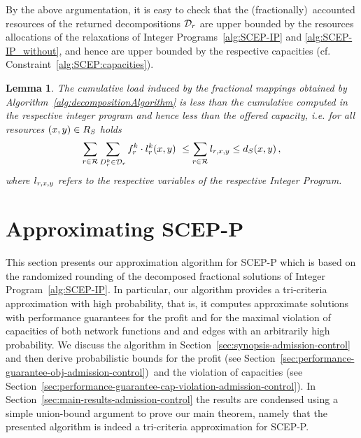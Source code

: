 \documentclass[10pt, conference, letterpaper]{IEEEtran}
\newtheorem{lemma}[theorem]{Lemma}
\begin{document}
By the above argumentation, it is easy to check that the (fractionally)~accounted resources of the returned decompositions $\PotEmbeddings$ are upper bounded by the resources allocations of the relaxations of Integer Programs~\ref{alg:SCEP-IP} and \ref{alg:SCEP-IP_without}, and hence are upper bounded by the respective capacities (cf. Constraint~\ref{alg:SCEP:capacities}). 

\begin{lemma}
\label{lem:allocations}
The cumulative load induced by the fractional mappings obtained by Algorithm~\ref{alg:decompositionAlgorithm} is less than the cumulative computed in the respective integer program and hence less than the offered capacity, i.e. for all resources $(x,y) \in  R_{S}$ holds
\begin{align}
\sum_{r \in \mathcal{R}} \sum_{D^k_{r} \in \mathcal{D}_r} f^k_r \cdot l^k_{r}(x,y)~\leq \sum_{r \in \mathcal{R}} l_{r, x,y} \leq  d_{S}(x,y)\,,
\label{eq:lem:allocations}
\end{align}
where $l_{r,x,y}$ refers to the respective variables of the respective Integer Program.
\end{lemma}


\section{Approximating SCEP-P}\label{sec:randround}

This section presents our approximation algorithm for SCEP-P which is based on the randomized rounding of the decomposed fractional solutions of Integer Program~\ref{alg:SCEP-IP}. 
In particular, our algorithm 
provides a tri-criteria approximation with high probability,
that is, 
it computes approximate solutions with performance guarantees for the 
profit and for the maximal violation of capacities of both network functions and
and edges with an arbitrarily high probability. 
We discuss the algorithm in Section~\ref{sec:synopsis-admission-control} and then derive probabilistic bounds for the profit (see Section~\ref{sec:performance-guarantee-obj-admission-control})~and the violation of capacities (see Section~\ref{sec:performance-guarantee-cap-violation-admission-control}). In Section~\ref{sec:main-results-admission-control} the results are condensed using a simple union-bound argument to prove our main theorem, namely that the presented algorithm is indeed a tri-criteria approximation for SCEP-P.
\end{document}
